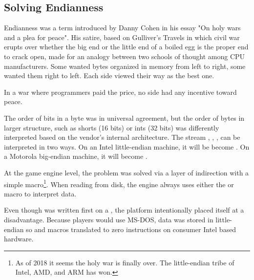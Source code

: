 \subsection{Solving Endianness}
Endianness was a term introduced by Danny Cohen in his essay "On holy wars and a plea for peace". His satire, based on Gulliver's Travels in which civil war erupts over whether the big end or the little end of a boiled egg is the proper end to crack open, made for an analogy between two schools of thought among CPU manufacturers. Some wanted bytes organized in memory from left to right, some wanted them right to left. Each side viewed their way as the best one.\\
\par
In a war where programmers paid the price, no side had any incentive toward peace.



The order of bits in a byte was in universal agreement, but the order of bytes in larger structure, such as shorts (16 bits) or ints (32 bits) was differently interpreted based on the vendor's internal architecture. The stream , , ,  can be interpreted in two ways. On an Intel little-endian machine, it will be become . On a Motorola big-endian machine, it will become .\\
\par
{}
\par
At the game engine level, the problem was solved via a layer of indirection with a simple macro\footnote{As of 2018 it seems the holy war is finally over. The little-endian tribe of Intel, AMD, and ARM has won.}. When reading from disk, the engine always uses either the  or  macro to interpret data.\\
\par
{}
\par
{}
\par
Even though \doom{} was written first on a \NeXT, the platform intentionally placed itself at a disadvantage. Because players would use MS-DOS, data was stored in little-endian so  and  macros translated to zero instructions on consumer Intel based hardware.


